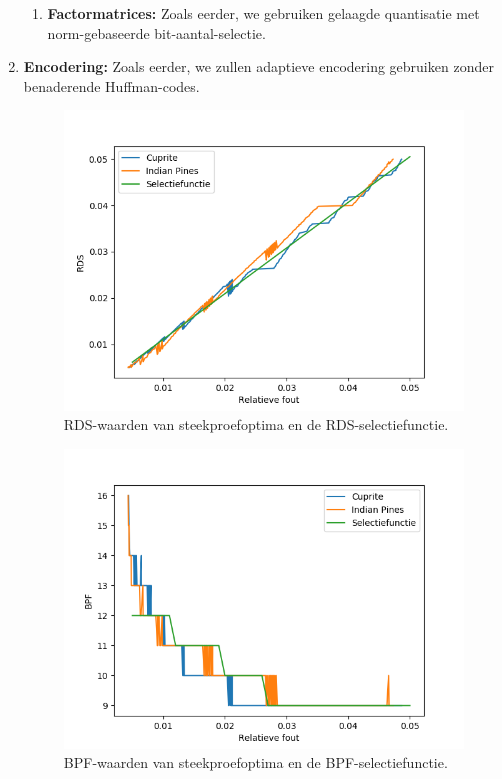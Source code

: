 \begin{enumerate}
\begin{enumerate}
\item \textbf{Factormatrices:} Zoals eerder, we gebruiken gelaagde quantisatie met norm-gebaseerde bit-aantal-selectie.
\end{enumerate}
\item \textbf{Encodering:} Zoals eerder, we zullen adaptieve encodering gebruiken zonder benaderende Huffman-codes.

\begin{figure}[]
  \centering
  \includegraphics[scale=0.7]{images/filtered_sweep_points_tensor_trains_RDS.png}
  \caption{RDS-waarden van steekproefoptima en de RDS-selectiefunctie.}
\label{fig:filtered-sweep-points-tensor-trains-RDS}
\end{figure}

\begin{figure}[]
  \centering
  \includegraphics[scale=0.7]{images/filtered_sweep_points_tensor_trains_BPF.png}
  \caption{BPF-waarden van steekproefoptima en de BPF-selectiefunctie.}
\label{fig:filtered-sweep-points-tensor-trains-BPF}
\end{figure}


\end{enumerate}
